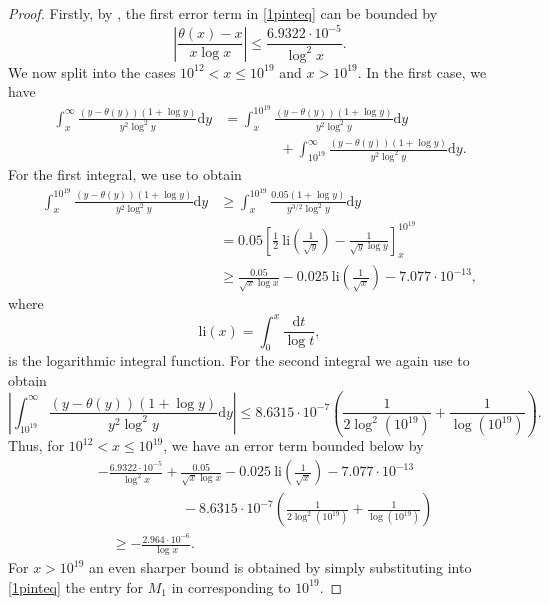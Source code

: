 \documentclass[12pt]{amsart}
\begin{document}
\begin{proof}
    Firstly, by \cite[Table 15]{Broad}, the first error term in \eqref{1pinteq} can be bounded by
    \begin{equation*}
        \left|\frac{\theta(x)-x}{x\log x}\right|\le\frac{6.9322\cdot 10^{-5}}{\log^2x}.
    \end{equation*}
We now split into the cases $10^{12}<x\le 10^{19}$ and $x>10^{19}$. In the first case, we have
\begin{align*}
    \int_x^\infty\frac{(y-\theta(y))(1+\log y)}{y^2\log^2y}\mathrm{d}y&=\int_x^{10^{19}}\frac{(y-\theta(y))(1+\log y)}{y^2\log^2y}\mathrm{d}y\\
    &\qquad\qquad+\int_{10^{19}}^\infty\frac{(y-\theta(y))(1+\log y)}{y^2\log^2y}\mathrm{d}y.
\end{align*}
For the first integral, we use \cite[Theorem 2]{Buthe3} to obtain
\begin{align*}
    \int_x^{10^{19}}\frac{(y-\theta(y))(1+\log y)}{y^2\log^2y}\mathrm{d}y&\ge\int_x^{10^{19}}\frac{0.05(1+\log y)}{y^{3/2}\log^2y}\mathrm{d}y\\
    &=0.05\left[\frac{1}{2}~\text{li}\left(\frac{1}{\sqrt{y}}\right)-\frac{1}{\sqrt{y}\log y}\right]_x^{10^{19}}\\
    &\ge\frac{0.05}{\sqrt{x}\log x}-0.025~\text{li}\left(\frac{1}{\sqrt{x}}\right)-7.077\cdot 10^{-13},
\end{align*}
where
\begin{equation} \label{eq: def-li(x)}
    \text{li}(x) = \int_0^x \frac{\mathrm{d}t}{\log t},
\end{equation}
is the logarithmic integral function.
For the second integral we again use \cite[Table 15]{Broad} to obtain
\begin{equation*}
    \left|\int_{10^{19}}^\infty\frac{(y-\theta(y))(1+\log y)}{y^2\log^2y}\mathrm{d}y\right|\le 8.6315\cdot 10^{-7}\left(\frac{1}{2\log^2(10^{19})}+\frac{1}{\log(10^{19})}\right).
\end{equation*}
Thus, for $10^{12}<x\le 10^{19}$, we have an error term bounded below by
\begin{align*}
    &-\frac{6.9322\cdot 10^{-5}}{\log^2x}+\frac{0.05}{\sqrt{x}\log x}-0.025~\text{li}\left(\frac{1}{\sqrt{x}}\right)-7.077\cdot 10^{-13}\\
    &\qquad\qquad\qquad-8.6315\cdot 10^{-7}\left(\frac{1}{2\log^2(10^{19})}+\frac{1}{\log(10^{19})}\right)\\
    &\quad\ge-\frac{2.964\cdot 10^{-6}}{\log x}.
\end{align*}
For $x>10^{19}$ an even sharper bound is obtained by simply substituting into \eqref{1pinteq} the entry for $M_1$ in \cite[Table 15]{Broad} corresponding to $10^{19}$.
\end{proof}
\end{document}
